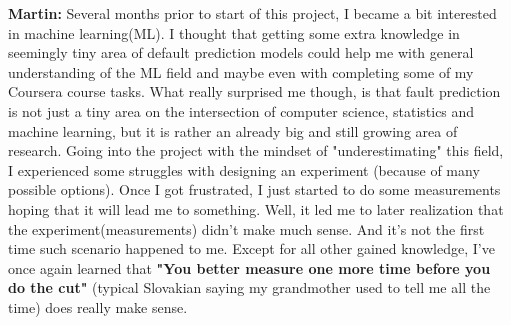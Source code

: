 \textbf{Martin:} Several months prior to start of this project, I became a bit interested in machine learning(ML). I thought that getting some extra knowledge in seemingly tiny area of default prediction models could help me with general understanding of the ML field and maybe even with completing some of my Coursera course tasks. What really surprised me though, is that fault prediction is not just a tiny area on the intersection of computer science, statistics and machine learning, but it is rather an already big and still growing area of research. Going into the project with the mindset of "underestimating" this field, I experienced some struggles with designing an experiment (because of many possible options). Once I got frustrated, I just started to do some measurements hoping that it will lead me to something. Well, it led me to later realization that the experiment(measurements) didn't make much sense. And it's not the first time such scenario happened to me. Except for all other gained knowledge, I've once again learned that \textbf{"You better measure one more time before you do the cut"} (typical Slovakian saying my grandmother used to tell me all the time) does really make sense.